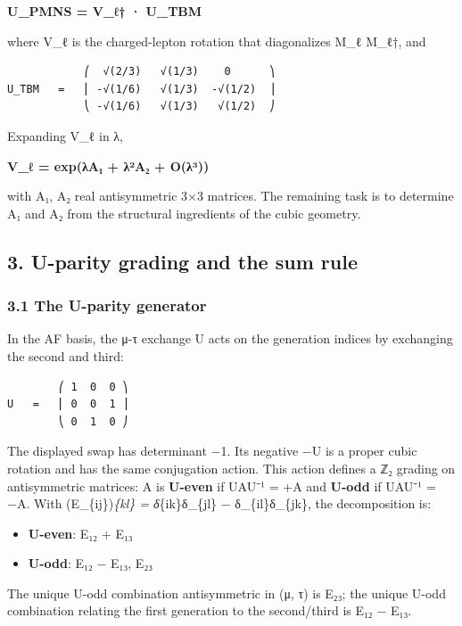 \documentclass[
]{article}
\providecommand{\tightlist}{%
  \setlength{\itemsep}{0pt}\setlength{\parskip}{0pt}}
\begin{document}
\textbf{U\_PMNS = V\_ℓ† · U\_TBM}

where V\_ℓ is the charged-lepton rotation that diagonalizes M\_ℓ M\_ℓ†,
and

\begin{verbatim}
            ⎛  √(2/3)   √(1/3)    0      ⎞
U_TBM   =   ⎜ -√(1/6)   √(1/3)  -√(1/2)  ⎟
            ⎝ -√(1/6)   √(1/3)   √(1/2)  ⎠
\end{verbatim}

Expanding V\_ℓ in λ,

\textbf{V\_ℓ = exp(λA₁ + λ²A₂ + O(λ³))}

with A₁, A₂ real antisymmetric 3×3 matrices. The remaining task is to
determine A₁ and A₂ from the structural ingredients of the cubic
geometry.

\hypertarget{u-parity-grading-and-the-sum-rule}{%
\subsection{3. U-parity grading and the sum
rule}\label{u-parity-grading-and-the-sum-rule}}

\hypertarget{the-u-parity-generator}{%
\subsubsection{3.1 The U-parity
generator}\label{the-u-parity-generator}}

In the AF basis, the μ-τ exchange U acts on the generation indices by
exchanging the second and third:

\begin{verbatim}
        ⎛ 1  0  0 ⎞
U   =   ⎜ 0  0  1 ⎟
        ⎝ 0  1  0 ⎠
\end{verbatim}

The displayed swap has determinant −1. Its negative −U is a proper cubic
rotation and has the same conjugation action. This action defines a ℤ₂
grading on antisymmetric matrices: A is \textbf{U-even} if UAU⁻¹ = +A
and \textbf{U-odd} if UAU⁻¹ = −A. With (E\_\{ij\})\emph{\{kl\} =
δ}\{ik\}δ\_\{jl\} − δ\_\{il\}δ\_\{jk\}, the decomposition is:

\begin{itemize}
\tightlist
\item
  \textbf{U-even}: E₁₂ + E₁₃
\item
  \textbf{U-odd}: E₁₂ − E₁₃, E₂₃
\end{itemize}

The unique U-odd combination antisymmetric in (μ, τ) is E₂₃; the unique
U-odd combination relating the first generation to the second/third is
E₁₂ − E₁₃.
\end{document}
